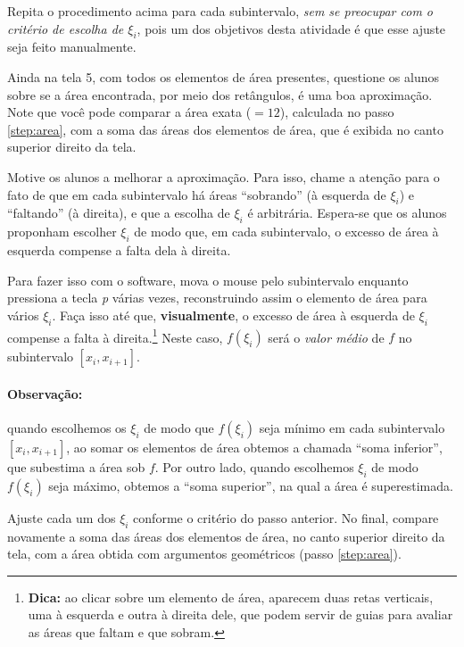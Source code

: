 \documentclass[a4paper,12pt]{scrartcl}
\begin{document}
\begin{compactenum}
      Repita o procedimento acima para cada subintervalo, \emph{sem se preocupar com o critério de escolha de $\xi_i$}, pois um dos objetivos desta atividade é que esse ajuste seja feito manualmente.
      
      \item Ainda na tela 5, com todos os elementos de área presentes, questione os alunos sobre se a área encontrada, por meio dos retângulos, é uma boa aproximação. Note que você pode comparar a área exata ($=12$), calculada no passo \ref{step:area}, com a soma das áreas dos elementos de área, que é exibida no canto superior direito da tela.
      
      \item Motive os alunos a melhorar a aproximação. Para isso, chame a atenção para o fato de que em cada subintervalo há áreas ``sobrando'' (à esquerda de $\xi_i$) e ``faltando'' (à direita), e que a escolha de $\xi_i$ é arbitrária. Espera-se que os alunos proponham escolher $\xi_i$ de modo que, em cada subintervalo, o excesso de área à esquerda compense a falta dela à direita.
      
      Para fazer isso com o software, mova o mouse pelo subintervalo enquanto pressiona a tecla \textit{p} várias vezes, reconstruindo assim o elemento de área para vários $\xi_i$. Faça isso até que, \textbf{visualmente}, o excesso de área à esquerda de $\xi_i$ compense a falta à direita.\footnote{\textbf{Dica:} ao clicar sobre um elemento de área, aparecem duas retas verticais, uma à esquerda e outra à direita dele, que podem servir de guias para avaliar as áreas que faltam e que sobram.} Neste caso, $f(\xi_i)$ será o \emph{valor médio} de $f$ no subintervalo $[x_i, x_{i+1}]$.
      
      \paragraph{Observação:} quando escolhemos os $\xi_i$ de modo que $f(\xi_i)$ seja mínimo em cada subintervalo $[x_i,x_{i+1}]$, ao somar os elementos de área obtemos a chamada ``soma inferior'', que subestima a área sob $f$. Por outro lado, quando escolhemos $\xi_i$ de modo $f(\xi_i)$ seja máximo, obtemos a ``soma superior'', na qual a área é superestimada.
      
      \item Ajuste cada um dos $\xi_i$ conforme o critério do passo anterior. No final, compare novamente a soma das áreas dos elementos de área, no canto superior direito da tela, com a área obtida com argumentos geométricos (passo \ref{step:area}).
      

\end{compactenum}
\end{document}

